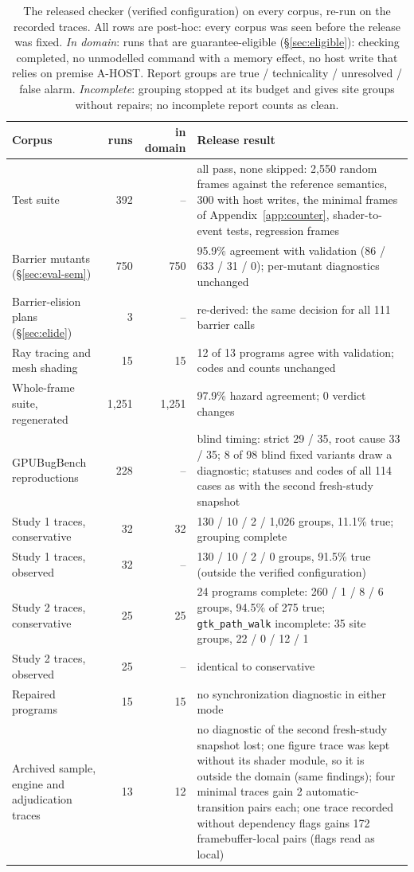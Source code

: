 \documentclass[acmtog,anonymous,review]{acmart}
\newcommand{\bench}{GPUBugBench\xspace}
\newcommand{\code}[1]{\texttt{#1}}
\begin{document}
\begin{table}[t]
\caption{The released checker (verified configuration) on every corpus, re-run on the
recorded traces. All rows are post-hoc: every corpus was seen before the release was fixed. \emph{In domain}: runs that are guarantee-eligible (\S\ref{sec:eligible}): checking completed, no
unmodelled command with a memory effect, no host write that relies on premise A-HOST. Report groups are
true / technicality / unresolved / false alarm. \emph{Incomplete}: grouping stopped at its budget and gives site
groups without repairs; no incomplete report counts as clean.}
\label{tab:release}
\small
\begin{tabular}{@{}lrrp{}@{}}
\toprule
Corpus & runs & in domain & Release result \\
\midrule
Test suite & 392 & -- & all pass, none skipped: 2,550 random frames against the reference semantics, 300 with host writes, the
minimal frames of Appendix~\ref{app:counter}, shader-to-event tests, regression frames \\
Barrier mutants (\S\ref{sec:eval-sem}) & 750 & 750 & 95.9\% agreement with validation (86 / 633 / 31 / 0); per-mutant
diagnostics unchanged \\
Barrier-elision plans (\S\ref{sec:elide}) & 3 & -- & re-derived: the same decision for all 111 barrier calls \\
Ray tracing and mesh shading & 15 & 15 & 12 of 13 programs agree with validation; codes and counts unchanged \\
Whole-frame suite, regenerated & 1,251 & 1,251 & 97.9\% hazard agreement; 0 verdict changes \\
\bench reproductions & 228 & -- & blind timing: strict 29 / 35, root cause 33 / 35; 8 of 98 blind fixed variants
draw a diagnostic; statuses and codes of all 114 cases as with the second fresh-study snapshot \\
Study 1 traces, conservative & 32 & 32 & 130 / 10 / 2 / 1,026 groups, 11.1\% true; grouping complete \\
Study 1 traces, observed & 32 & -- & 130 / 10 / 2 / 0 groups, 91.5\% true (outside the verified configuration) \\
Study 2 traces, conservative & 25 & 25 & 24 programs complete: 260 / 1 / 8 / 6 groups, 94.5\% of 275 true;
\code{gtk\_path\_walk} incomplete: 35 site groups, 22 / 0 / 12 / 1 \\
Study 2 traces, observed & 25 & -- & identical to conservative \\
Repaired programs & 15 & 15 & no synchronization diagnostic in either mode \\
Archived sample, engine and adjudication traces & 13 & 12 & no diagnostic of the second fresh-study snapshot lost;
one figure trace was kept without its shader module, so it is outside the domain (same findings);
four minimal traces gain 2 automatic-transition pairs each; one trace recorded without dependency flags gains 172
framebuffer-local pairs (flags read as local) \\
\bottomrule
\end{tabular}
\end{table}
\end{document}
